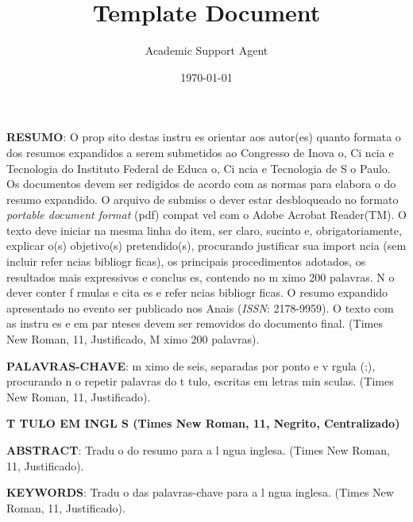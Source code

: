 \documentclass{article}
\title{Template Document}
\author{Academic Support Agent}
\date{\today}
\begin{document}
\maketitle







\vspace{0.5cm}
\noindent\textbf{RESUMO}: O prop sito destas instru es   orientar aos autor(es) quanto   formata o dos resumos expandidos a serem submetidos ao Congresso de Inova o, Ci ncia e Tecnologia do Instituto Federal de Educa o, Ci ncia e Tecnologia de S o Paulo. Os documentos devem ser redigidos de acordo com as normas para elabora o do resumo expandido. O arquivo de submiss o dever  estar desbloqueado no formato \textit{portable document format} (pdf) compat vel com o Adobe Acrobat Reader(TM). O texto deve iniciar na mesma linha do item, ser claro, sucinto e, obrigatoriamente, explicar o(s) objetivo(s) pretendido(s), procurando justificar sua import ncia (sem incluir refer ncias bibliogr ficas), os principais procedimentos adotados, os resultados mais expressivos e conclus es, contendo no m ximo 200 palavras. N o dever  conter f rmulas e cita es e refer ncias bibliogr ficas. O resumo expandido apresentado no evento ser  publicado nos Anais (\textit{ISSN}: 2178-9959). O texto com as instru es e em par nteses devem ser removidos do documento final. (Times New Roman, 11, Justificado, M ximo 200 palavras).

\vspace{0.5cm}
\noindent\textbf{PALAVRAS-CHAVE}: m ximo de seis, separadas por ponto e v rgula (;), procurando n o repetir palavras do t tulo, escritas em letras min sculas. (Times New Roman, 11, Justificado).

\vspace{0.5cm}
 \begin{center}
 \textbf{T TULO EM INGL S (Times New Roman, 11, Negrito, Centralizado)}
 \end{center}

\noindent\textbf{ABSTRACT}: Tradu o do resumo para a l ngua inglesa. (Times New Roman, 11, Justificado).

\vspace{0.5cm}
\noindent\textbf{KEYWORDS}: Tradu o das palavras-chave para a l ngua inglesa. (Times New Roman, 11, Justificado).
\end{document}
